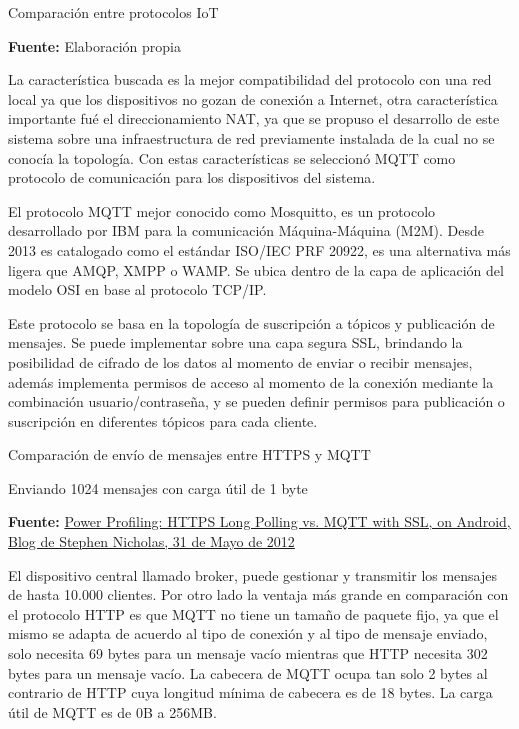 \documentclass[../principal]{subfiles}
\begin{document}
  \begin{table}[H]
    \centering
    \caption{Comparación entre protocolos IoT}
    
    \caption*{\textbf{Fuente:} Elaboración propia}
    \label{tab:seleccion_protocolo_iot}
  \end{table}
  
  La característica buscada es la mejor compatibilidad del protocolo con una red local ya que los dispositivos no gozan de conexión a Internet, otra característica importante fué el direccionamiento NAT, ya que se propuso el desarrollo de este sistema sobre una infraestructura de red previamente instalada de la cual no se conocía la topología. Con estas características se seleccionó MQTT como protocolo de comunicación para los dispositivos del sistema.

  El protocolo MQTT mejor conocido como Mosquitto, es un protocolo desarrollado por IBM para la comunicación Máquina-Máquina (M2M). Desde 2013 es catalogado como el estándar ISO/IEC PRF 20922, es una alternativa más ligera que AMQP, XMPP o WAMP. Se ubica dentro de la capa de aplicación del modelo OSI en base al protocolo TCP/IP.

  Este protocolo se basa en la topología de suscripción a tópicos y publicación de mensajes. Se puede implementar sobre una capa segura SSL, brindando la posibilidad de cifrado de los datos al momento de enviar o recibir mensajes, además implementa permisos de acceso al momento de la conexión mediante la combinación usuario/contraseña, y se pueden definir permisos para publicación o suscripción en diferentes tópicos para cada cliente.

  \begin{table}[H]
    \centering
    \caption{Comparación de envío de mensajes entre HTTPS y MQTT}
    \caption*{Enviando 1024 mensajes con carga útil de 1 byte}
    
    \caption*{\textbf{Fuente:} \href{http://stephendnicholas.com/posts/power-profiling-mqtt-vs-https}{Power Profiling: HTTPS Long Polling vs. MQTT with SSL, on Android, Blog de Stephen Nicholas, 31 de Mayo de 2012}}
    \label{tab:comparacion_http_mqtt_envio}
  \end{table}

El dispositivo central llamado broker, puede gestionar y transmitir los mensajes de hasta 10.000 clientes. Por otro lado la ventaja más grande en comparación con el protocolo HTTP es que MQTT no tiene un tamaño de paquete fijo, ya que el mismo se adapta de acuerdo al tipo de conexión y al tipo de mensaje enviado, solo necesita 69 bytes para un mensaje vacío mientras que HTTP necesita 302 bytes para un mensaje vacío. La cabecera de MQTT ocupa tan solo 2 bytes al contrario de HTTP cuya longitud mínima de cabecera es de 18 bytes. La carga útil de MQTT es de 0B a 256MB.
\end{document}
